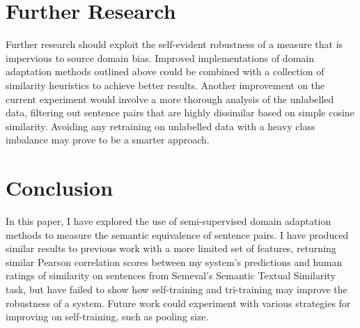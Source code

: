 \documentclass[11pt]{article}
\begin{document}
\section{Further Research}
Further research should exploit the self-evident robustness of a measure that is impervious to source domain bias. Improved implementations of domain adaptation methods outlined above could be combined with a collection of similarity heuristics to achieve better results. Another improvement on the current experiment would involve a more thorough analysis of the unlabelled data, filtering out sentence pairs that are highly dissimilar based on simple cosine similarity. Avoiding any retraining on unlabelled data with a heavy class imbalance may prove to be a smarter approach.\\

\section{Conclusion}

In this paper, I have explored the use of semi-supervised domain adaptation methods to measure the semantic equivalence of sentence pairs. I have produced similar results to previous work with a more limited set of features, returning similar Pearson correlation scores between my system's predictions and human ratings of similarity on sentences from Semeval's Semantic Textual Similarity task, but have failed to show how self-training and tri-training may improve the robustness of a system. Future work could experiment with various strategies for improving on self-training, such as pooling size.  \\


\end{document}

